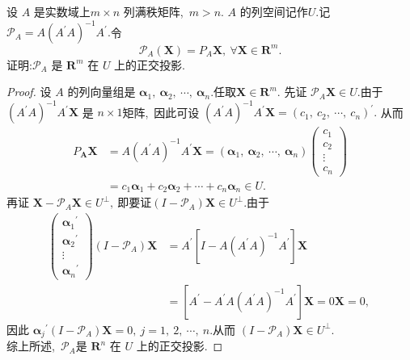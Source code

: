 \newpage
\begin{problem}
	设 $ A $ 是实数域上$  m \times n $ 列满秩矩阵,\  $ m>n .$ $ A$  的列空间记作$  U .$记 $ \mathcal{P}_{A}=   A\left(A^{\prime} A\right)^{-1} A^{\prime} .$令
	$$\mathcal{P}_{A}(\boldsymbol{X})=P_{A} \boldsymbol{X},\  \forall \boldsymbol{X} \in \mathbf{R}^{m} .$$
	证明:$  \mathcal{P}_{A} $ 是  $\mathbf{R}^{m} $ 在 $ U $ 上的正交投影.
\end{problem}
\begin{proof}
	设 $ A $ 的列向量组是 $ \boldsymbol{\alpha}_{1},\  \boldsymbol{\alpha}_{2},\  \cdots,\  \boldsymbol{\alpha}_{n}  .$任取$  \boldsymbol{X} \in \mathbf{R}^{m}  .$
	先证 $ \mathcal{P}_{A} \boldsymbol{X} \in U .$由于 $ \left(A^{\prime} A\right)^{-1} A^{\prime} \mathbf{X} $ 是 $ n \times 1  $矩阵,\  因此可设 $ \left(A^{\prime} A\right)^{-1} A^{\prime} \boldsymbol{X}=\left(c_{1},\  c_{2},\  \cdots,\  c_{n}\right)^{\prime} .$ 从而
	$$\begin{aligned}
		P_{\boldsymbol{A}} \boldsymbol{X} & =A\left(A^{\prime} A\right)^{-1} A^{\prime} \boldsymbol{X}=\left(\boldsymbol{\alpha}_{1},\  \boldsymbol{\alpha}_{2},\  \cdots,\  \boldsymbol{\alpha}_{n}\right)\left(\begin{array}{c}
			c_{1} \\
			c_{2} \\
			\vdots \\
			c_{n}
		\end{array}\right) \\
		& =c_{1} \boldsymbol{\alpha}_{1}+c_{2} \boldsymbol{\alpha}_{2}+\cdots+c_{n} \boldsymbol{\alpha}_{n} \in U .
	\end{aligned}$$
	再证 $ \boldsymbol{X}-\mathcal{P}_{A} \boldsymbol{X} \in U^{\perp} ,\  $即要证$  \left(I-\mathcal{P}_{A}\right) \boldsymbol{X} \in U^{\perp} .$由于
	$$\begin{aligned}
		\left(\begin{array}{c}
			\boldsymbol{\alpha}_{1}{ }^{\prime} \\
			\boldsymbol{\alpha}_{2}{ }^{\prime} \\
			\vdots \\
			\boldsymbol{\alpha}_{n}{ }^{\prime}
		\end{array}\right)\left(I-\mathcal{P}_{A}\right) \boldsymbol{X} & =A^{\prime}\left[I-A\left(A^{\prime} A\right)^{-1} A^{\prime}\right] \boldsymbol{X} \\
		& =\left[A^{\prime}-A^{\prime} A\left(A^{\prime} A\right)^{-1} A^{\prime}\right] \boldsymbol{X}=0 \mathbf{X}=0,\ 
	\end{aligned}$$
	因此  $\boldsymbol{\alpha}_{j}{ }^{\prime}\left(I-\mathcal{P}_{A}\right) \boldsymbol{X}=0,\  j=1,\ 2,\  \cdots,\  n  .$从而 $ \left(I-\mathcal{P}_{A}\right) \boldsymbol{X} \in U^{\perp}.$ \\
	综上所述,\  $ \mathcal{P}_{A}  $是 $ \mathbf{R}^{n} $ 在 $ U $ 上的正交投影.
\end{proof}
